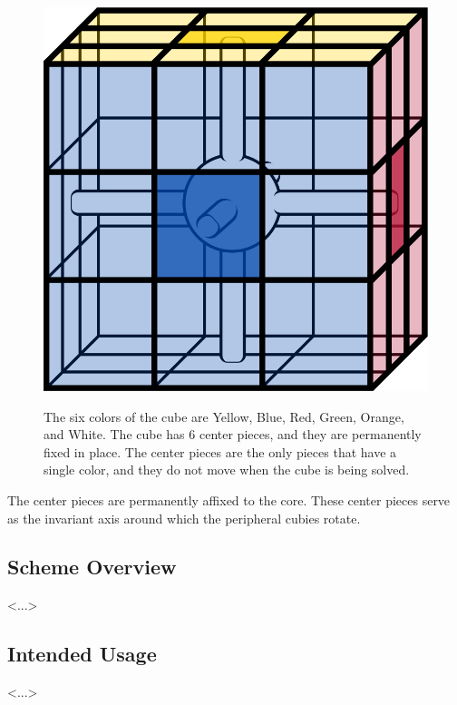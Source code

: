 \documentclass[12pt]{article}
\begin{document}
\begin{figure}[H]
    \vspace{20pt}
    
    \hspace{20pt}
    \begin{minipage}{.3\textwidth}
        \includegraphics[scale=0.1]{core.png}
    \end{minipage}%
    \begin{minipage}{.6\textwidth}
        The six colors of the cube are Yellow, Blue, Red, Green, Orange, and White. The cube has 6 center pieces, and they are permanently fixed in place. The center pieces are the only pieces that have a single color, and they do not move when the cube is being solved.\\
    \end{minipage}
\end{figure}

The center pieces are permanently affixed to the core. These center pieces serve as the invariant axis around which the peripheral cubies rotate. 



\subsection{Scheme Overview}
<...>

\subsection{Intended Usage}
<...>
\end{document}
